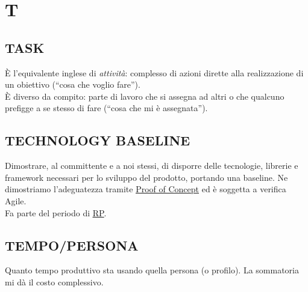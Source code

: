 \newpage
	\section{T} \label{sec:T}

		\subsection{TASK}  \label{task}
		È l'equivalente inglese di \textit{attività}: complesso di azioni dirette alla realizzazione di un obiettivo (``cosa che voglio fare''). \\
		È diverso da compito: parte di lavoro che si assegna ad altri o che qualcuno prefigge a se stesso di fare (``cosa che mi è assegnata'').

		\subsection{TECHNOLOGY BASELINE}  \label{technologybaseline}
		Dimostrare, al committente e a noi stessi, di disporre delle tecnologie, librerie e framework necessari per lo sviluppo del prodotto, portando una baseline.
		Ne dimostriamo l'adeguatezza tramite \underline{\hyperref[poc]{Proof of Concept}} ed è soggetta a verifica Agile. \\
		Fa parte del periodo di \underline{\hyperref[RP]{RP}}.

		\subsection{TEMPO/PERSONA}  \label{tempopersona}
		Quanto tempo produttivo sta usando quella persona (o profilo). La sommatoria mi dà il costo complessivo.


